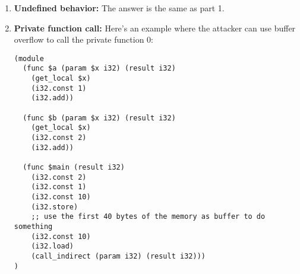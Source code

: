 \documentclass[11pt]{article}
\begin{document}
\begin{enumerate}
\item \textbf{Undefined behavior:} The answer is the same as part 1.
\item \textbf{Private function call:} Here's an example where the attacker can use buffer overflow to call the private function 0:
\begin{verbatim}
(module
  (func $a (param $x i32) (result i32)
    (get_local $x)
    (i32.const 1)
    (i32.add))

  (func $b (param $x i32) (result i32)
    (get_local $x)
    (i32.const 2)
    (i32.add))

  (func $main (result i32)
    (i32.const 2)
    (i32.const 1)
    (i32.const 10)
    (i32.store)
    ;; use the first 40 bytes of the memory as buffer to do something
    (i32.const 10)
    (i32.load)
    (call_indirect (param i32) (result i32)))
)
\end{verbatim}
\end{enumerate}
\end{document}
